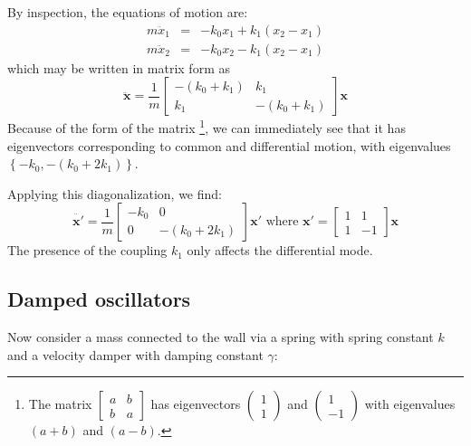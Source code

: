 By inspection, the equations of motion are:
\begin{eqnarray}
m\ddot{x}_{1} & = & -k_{0}x_{1}+k_{1}(x_{2}-x_{1})\\
m\ddot{x}_{2} & = & -k_{0}x_{2}-k_{1}(x_{2}-x_{1})
\end{eqnarray}
which may be written in matrix form as
\begin{equation}
\mathbf{\ddot{x}}=\frac{1}{m}\left[\begin{array}{cc}
-(k_{0}+k_{1}) & k_{1}\\
k_{1} & -(k_{0}+k_{1})
\end{array}\right]\mathbf{x}
\end{equation}
Because of the form of the matrix%
\footnote{The matrix $\left[\begin{array}{cc}
a & b\\
b & a
\end{array}\right]$ has eigenvectors $\left(\begin{array}{c}
1\\
1
\end{array}\right)$ and $\left(\begin{array}{c}
1\\
-1
\end{array}\right)$ with eigenvalues $(a+b)$ and $(a-b)$.%
}, we can immediately see that it has eigenvectors corresponding to
common and differential motion, with eigenvalues $\left\{ -k_{0},-(k_{0}+2k_{1})\right\} $. 

Applying this diagonalization, we find:
\[
\mathbf{\ddot{x'}}=\frac{1}{m}\left[\begin{array}{cc}
-k_{0} & 0\\
0 & -(k_{0}+2k_{1})
\end{array}\right]\mathbf{x'}\text{ where }\mathbf{x'}=\left[\begin{array}{cc}
1 & 1\\
1 & -1
\end{array}\right]\mathbf{x}
\]
The presence of the coupling $k_{1}$ only affects the differential
mode.


\subsection{Damped oscillators}

Now consider a mass connected to the wall via a spring with spring
constant $k$ and a velocity damper with damping constant $\gamma$:

